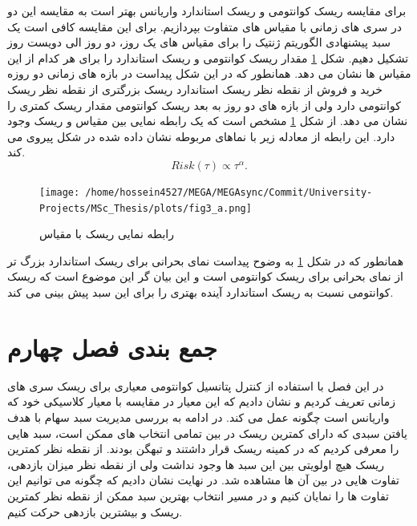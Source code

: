 \documentclass[a4paper,titlepage,12pt,fleqn,oneside]{report}
\begin{document}
	برای مقایسه ریسک کوانتومی و ریسک استاندارد واریانس بهتر است به مقایسه این دو در سری های زمانی با مقیاس های متفاوت بپردازیم.
	برای این مقایسه کافی است یک سبد پیشنهادی الگوریتم ژنتیک را برای مقیاس های یک روز، دو روز الی دویست روز تشکیل دهیم. شکل 
	\ref{fig:5.9}
	مقدار ریسک کوانتومی و ریسک استاندارد را برای هر کدام از این مقیاس ها نشان می دهد. همانطور که در این شکل پیداست در بازه های زمانی دو روزه خرید و فروش از نقطه نظر ریسک استاندارد ریسک بزرگتری از نقطه نظر ریسک کوانتومی دارد ولی از بازه های دو روز به بعد ریسک کوانتومی مقدار ریسک کمتری را نشان می دهد. از شکل 
	\ref{fig:5.9}
	مشخص است که یک رابطه نمایی بین مقیاس و ریسک وجود دارد. این رابطه از معادله زیر با نماهای مربوطه نشان داده شده در شکل پیروی می کند. 
	\begin{equation}
		Risk(\tau) \propto \tau^\alpha.
		\label{eq:4}
	\end{equation}
	\begin{figure}[ptb]
		\centering
		\texttt{[image: /home/hossein4527/MEGA/MEGAsync/Commit/University-Projects/MSc\_Thesis/plots/fig3\_a.png]}
		\caption{رابطه نمایی ریسک با مقیاس}
		\label{fig:5.9}
	\end{figure}
	همانطور که در شکل
	\ref{fig:5.9}
	به وضوح پیداست نمای بحرانی برای ریسک استاندارد بزرگ تر از نمای بحرانی برای ریسک کوانتومی است و این بیان  گر این موضوع است که ریسک کوانتومی نسبت به ریسک استاندارد آینده بهتری را برای این سبد پیش بینی می کند.
	
	\section{جمع بندی فصل چهارم}
	در این فصل با استفاده از کنترل پتانسیل کوانتومی معیاری برای ریسک سری های زمانی تعریف کردیم و نشان دادیم که این معیار در مقایسه با معیار کلاسیکی خود که واریانس است چگونه عمل می کند. در ادامه به بررسی مدیریت سبد سهام با هدف یافتن سبدی که دارای کمترین ریسک در بین تمامی انتخاب های ممکن است، سبد هایی را معرفی کردیم که در کمینه ریسک قرار داشتند و تبهگن بودند. از نقطه نظر کمترین ریسک هیچ اولویتی بین این سبد ها وجود نداشت ولی از نقطه نظر میزان بازدهی، تفاوت هایی در بین آن ها مشاهده شد. در نهایت نشان دادیم که چگونه می توانیم این تفاوت ها را نمایان کنیم و در مسیر انتخاب بهترین سبد ممکن از نقطه نظر کمترین ریسک و بیشترین بازدهی حرکت کنیم.
	
	
	
\end{document}
